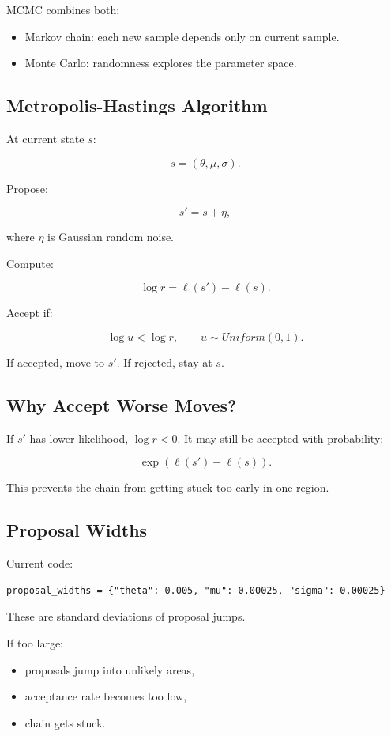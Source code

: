 \documentclass[11pt]{article}
\begin{document}
MCMC combines both:

\begin{itemize}
  \item Markov chain: each new sample depends only on current sample.
  \item Monte Carlo: randomness explores the parameter space.
\end{itemize}

\subsection{Metropolis-Hastings Algorithm}

At current state $s$:

\[
s = (\theta,\mu,\sigma).
\]

Propose:

\[
s' = s + \eta,
\]

where $\eta$ is Gaussian random noise.

Compute:

\[
\log r = \ell(s') - \ell(s).
\]

Accept if:

\[
\log u < \log r,
\qquad u\sim Uniform(0,1).
\]

If accepted, move to $s'$. If rejected, stay at $s$.

\subsection{Why Accept Worse Moves?}

If $s'$ has lower likelihood, $\log r < 0$. It may still be accepted with
probability:

\[
\exp(\ell(s')-\ell(s)).
\]

This prevents the chain from getting stuck too early in one region.

\subsection{Proposal Widths}

Current code:

\begin{lstlisting}[style=pythonstyle]
proposal_widths = {"theta": 0.005, "mu": 0.00025, "sigma": 0.00025}
\end{lstlisting}

These are standard deviations of proposal jumps.

If too large:

\begin{itemize}
  \item proposals jump into unlikely areas,
  \item acceptance rate becomes too low,
  \item chain gets stuck.
\end{itemize}
\end{document}
